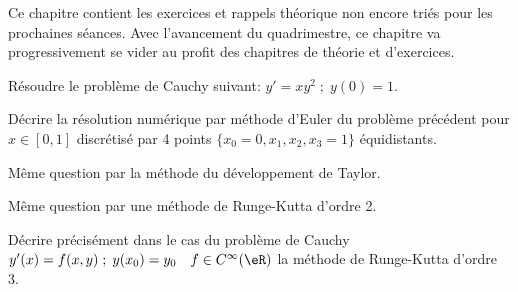 
 Ce chapitre contient les exercices et rappels théorique non encore triés pour les prochaines séances. Avec l'avancement du quadrimestre, ce chapitre va progressivement se vider au profit des chapitres de théorie et d'exercices.

\thispagestyle{empty}
{
}

\vspace{4mm}

  Résoudre le problème de 
Cauchy suivant: $y'=xy^2\;;\;y(0)=1$.

\vspace{4mm}


   Décrire la résolution numérique par méthode d'Euler du problème précédent
pour $x\in[0,1]$ discrétisé par 4 points $\{x_0=0,x_1,x_2,x_3=1\}$ équidistants.

\vspace{4mm}

 Même question par la méthode du développement de Taylor.
\vspace{4mm}

  Même question par une méthode de Runge-Kutta d'ordre 2.
\vspace{4mm}

Décrire précisément dans le cas du problème de Cauchy $y'(x)=f(x,y)\;;\;y(x_0)=y_0\quad f\in C^\infty(\eR)$
la méthode de Runge-Kutta d'ordre 3.

